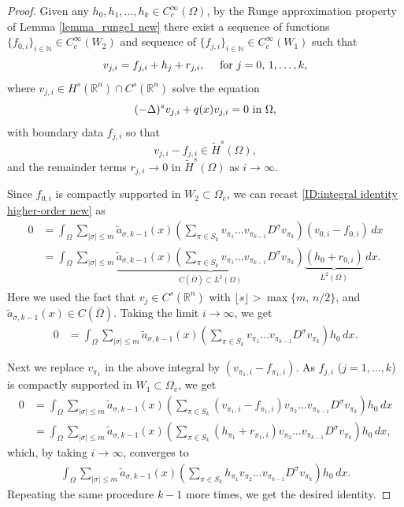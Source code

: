 \documentclass [oneside,11pt] {amsart}
\newcommand{\floor}[1]{\lfloor #1 \rfloor}
\numberwithin{equation}{section}
\newcommand{\R}{\mathbb{R}}
\newcommand{\dx}{\,dx}
\newcommand{\LC}{\left(}
\newcommand{\RC}{\right)}
\begin{document}
\begin{proof}
Given any $h_0, h_1, ..., h_k\in C_c^\infty(\Omega)$, by the Runge approximation property of Lemma \ref{lemma_runge1 new} there exist a sequence of functions $\{f_{0,i}\}_{i\in\mathbb{N}}\in C_c^\infty(W_2)$ and sequence of $\{f_{j,i}\}_{i\in\mathbb{N}}\in C_c^\infty(W_1)$ such that 
\[
v_{j,i}= f_{j,i}+h_j +r_{j,i},\quad\hbox{ for }j=0,\,1,\ldots, k,
\]
where  $v_{j,i}\in H^s(\R^n)\cap C^s(\R^n)$ solve the equation 
$$
(-\Delta)^s v_{j,i} + q(x) v_{j,i} =0 \hbox{ in }\Omega, 
$$
with boundary data $f_{j,i}$ so that 
$$
v_{j,i}-f_{j,i} \in \widetilde{H}^s(\Omega),
$$
and the remainder terms $r_{j,i}\to 0$ in $\widetilde{H}^{s}(\Omega)$ as $i\to \infty$.

Since $f_{0,i}$ is compactly supported in $W_2\subset \Omega_e$, we can recast \eqref{ID:integral identity higher-order new} as
\begin{align*}
0&= \int_\Omega \sum_{|\sigma|\le m} \widetilde{a}_{\sigma,k-1}(x)\LC \sum_{\pi\in S_k} v_{\pi_1}\ldots v_{\pi_{k-1}}D^\sigma v_{\pi_k}\RC (v_{0,i}-f_{0,i}) \dx \\
&=\int_\Omega \sum_{|\sigma|\le m} \underbrace{\widetilde{a}_{\sigma,k-1}(x)\LC \sum_{\pi\in S_k} v_{\pi_1}\ldots v_{\pi_{k-1}}D^\sigma v_{\pi_k}\RC}_{C(\overline\Omega)\subset L^2(\Omega)} \underbrace{(h_{0 }+r_{0,i})}_{L^2(\Omega)} \dx.
\end{align*}
Here we used the fact that $v_j\in C^s(\R^n)$ with $\floor{s}>\max\{m,\,n/2\}$, and $\widetilde{a}_{\sigma,k-1}(x)\in C(\overline{\Omega})$. Taking the limit $i\rightarrow \infty$, we get
\begin{align*}
0&=\int_\Omega \sum_{|\sigma|\le m} \widetilde{a}_{\sigma,k-1}(x)\LC \sum_{\pi\in S_k} v_{\pi_1}\ldots v_{\pi_{k-1}}D^\sigma v_{\pi_k}\RC h_{0 }  \dx.
\end{align*}

Next we replace $v_{\pi_1}$ in the above integral by $(v_{\pi_1,i}-f_{\pi_1,i})$. As $f_{j,i}$ ($j=1,\ldots, k$) is compactly supported in $W_1\subset \Omega_e$, we get
\begin{align*}
0&=\int_\Omega \sum_{|\sigma|\le m} \widetilde{a}_{\sigma,k-1}(x)\LC \sum_{\pi\in S_k}   (v_{\pi_1,i}-f_{\pi_1,i})v_{\pi_{2} }\ldots  v_{\pi_{k-1} }  D^\sigma v_{\pi_k}\RC h_{0}  \dx\\
&=\int_\Omega \sum_{|\sigma|\le m} \widetilde{a}_{\sigma,k-1}(x)\LC \sum_{\pi\in S_k}   (h_{\pi_1}+r_{\pi_1,i})v_{\pi_{2} }\ldots  v_{\pi_{k-1} }  D^\sigma v_{\pi_k}\RC h_{0 }  \dx,
\end{align*}
which, by taking $i\rightarrow\infty$, converges to 
\begin{align*}
\int_\Omega \sum_{|\sigma|\le m} \widetilde{a}_{\sigma,k-1}(x)\LC \sum_{\pi\in S_k}    h_{\pi_1} v_{\pi_{2} }\ldots  v_{\pi_{k-1} }  D^\sigma v_{\pi_k}\RC h_{0 }  \dx.
\end{align*}
Repeating the same procedure $k-1$ more times, we get the desired identity. 
\end{proof}
\end{document}
